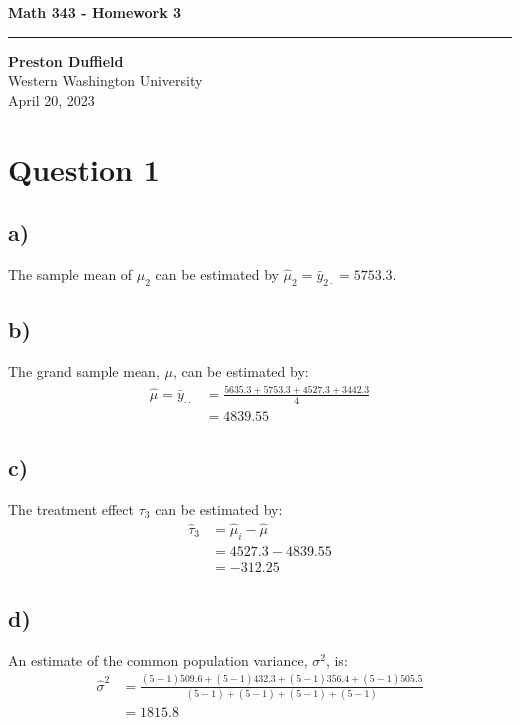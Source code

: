 \documentclass{article}
\begin{document}
\noindent
\begin{minipage}[t]{0.6\textwidth}
    \begin{flushleft}
        \LARGE\textbf{Math 343 - Homework 3} \\
        \vspace{6pt} %
        \hrule width 10cm
        \vspace{12pt}
        \large\textbf{Preston Duffield} \\
        \large Western Washington University \\
        April 20, 2023
        \vspace{24pt}
    \end{flushleft}
\end{minipage}

\section*{Question 1}
\subsection*{a)}
The sample mean of $\mu_2$ can be estimated by $\hat{\mu}_2 = \bar{y}_{2 \cdot} = 5753.3$.
\subsection*{b)}
The grand sample mean, $\mu$, can be estimated by:
\begin{align*}
  \hat{\mu} = \bar{y}_{\cdot \cdot} & = \frac{5635.3+5753.3+4527.3+3442.3}{4} \\
  & = 4839.55
\end{align*}
\subsection*{c)}
The treatment effect $\tau_3$ can be estimated by:
\begin{align*}
  \hat{\tau}_3 & = \hat{\mu}_i - \hat{\mu} \\
  & = 4527.3 - 4839.55 \\
  & = -312.25
\end{align*}
\subsection*{d)}
An estimate of the common population variance, $\sigma^2$, is:
\begin{align*}
  \hat{\sigma}^2 & = \frac{(5-1)509.6 + (5-1)432.3 + (5-1)356.4 + (5-1)505.5}
  {(5-1)+(5-1)+(5-1)+(5-1)} \\
  & = 1815.8 
\end{align*}
\end{document}
